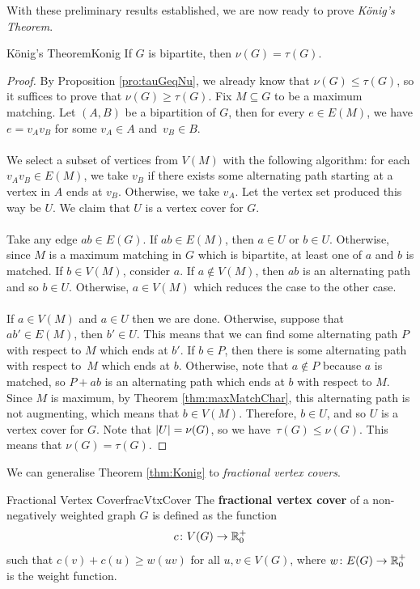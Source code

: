 \documentclass[math]{amznotes}
\theoremstyle{remark}
\begin{document}
With these preliminary results established, we are now ready to prove \textit{K\"{o}nig's Theorem}.
\begin{thmbox}{K\"{o}nig's Theorem}{Konig}
    If $G$ is bipartite, then $\nu(G) = \tau(G)$.
    \tcblower
    \begin{proof}
        By Proposition \ref{pro:tauGeqNu}, we already know that $\nu(G) \leq \tau(G)$, so it suffices to prove that $\nu(G) \geq \tau(G)$. Fix $M \subseteq G$ to be a maximum matching. Let $(A, B)$ be a bipartition of $G$, then for every $e \in E(M)$, we have $e = v_Av_B$ for some $v_A \in A$ and~$v_B \in B$.
        \\\\
        We select a subset of vertices from $V(M)$ with the following algorithm: for each $v_Av_B \in E(M)$, we take $v_B$ if there exists some alternating path starting at a vertex in $A$ ends at $v_B$. Otherwise, we take $v_A$. Let the vertex set produced this way be $U$. We claim that $U$ is a vertex cover for $G$.
        \\\\
        Take any edge $ab \in E(G)$. If $ab \in E(M)$, then $a \in U$ or $b \in U$. Otherwise, since $M$ is a maximum matching in $G$ which is bipartite, at least one of $a$ and $b$ is matched.  If $b \in V(M)$, consider $a$. If $a \notin V(M)$, then $ab$ is an alternating path and so $b \in U$. Otherwise, $a \in V(M)$ which reduces the case to the other case.
        \\\\
        If $a \in V(M)$ and $a \in U$ then we are done. Otherwise, suppose that $ab' \in E(M)$, then $b' \in U$. This means that we can find some alternating path $P$ with respect to $M$ which ends at $b'$. If $b \in P$, then there is some alternating path with respect to~$M$ which ends at $b$. Otherwise, note that $a \notin P$ because $a$ is matched, so $P + ab$ is an alternating path which ends at $b$ with respect to $M$. Since $M$ is maximum, by Theorem \ref{thm:maxMatchChar}, this alternating path is not augmenting, which means that $b \in V(M)$. Therefore, $b \in U$, and so $U$ is a vertex cover for $G$. Note that ${\left\lvert {U} \right\rvert} = \nu(G)$, so we have~$\tau(G) \leq \nu(G)$. This means that $\nu(G) = \tau(G)$.
    \end{proof}
\end{thmbox}
We can generalise Theorem \ref{thm:Konig} to \textit{fractional vertex covers}.
\begin{dfnbox}{Fractional Vertex Cover}{fracVtxCover}
    The {\color{red} \textbf{fractional vertex cover}} of a non-negatively weighted graph $G$ is defined as the function
    \begin{equation*}
        c \colon V(G) \to \mathbb{R}^+_0
    \end{equation*}
    such that $c(v) + c(u) \geq w(uv)$ for all $u, v \in V(G)$, where $w \colon E(G) \to \mathbb{R}^+_0$ is the weight function.
\end{dfnbox}
\end{document}
